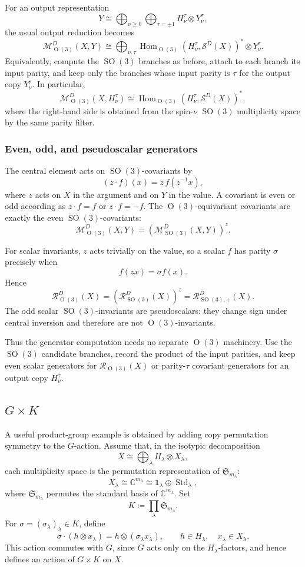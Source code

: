 \documentclass[11pt]{article}
\newcommand{\dsC}{\mathbb{C}}
\newcommand{\scM}{\mathcal{M}}
\newcommand{\scR}{\mathcal{R}}
\newcommand{\scS}{\mathcal{S}}
\newcommand{\SO}{\operatorname{SO}}
\newcommand{\Orth}{\operatorname{O}}
\theoremstyle{definition}
\begin{document}
For an output representation
\[
  Y\cong
  \bigoplus_{\nu\ge 0}\bigoplus_{\tau=\pm1}
  H_\nu^\tau\otimes Y_\nu^\tau,
\]
the usual output reduction becomes
\[
  \scM_{\Orth(3)}^D(X,Y)
  \cong
  \bigoplus_{\nu,\tau}
  \operatorname{Hom}_{\Orth(3)}\!\left(H_\nu^\tau,\scS^D(X)\right)^*
  \otimes Y_\nu^\tau .
\]
Equivalently, compute the $\SO(3)$ branches as before, attach to each branch its input parity, and keep only the branches whose input parity is $\tau$ for the output copy $Y_\nu^\tau$.
In particular,
\[
  \scM_{\Orth(3)}^D(X,H_\nu^\tau)
  \cong
  \operatorname{Hom}_{\Orth(3)}\!\left(H_\nu^\tau,\scS^D(X)\right)^*,
\]
where the right-hand side is obtained from the spin-$\nu$ $\SO(3)$ multiplicity space by the same parity filter.

\subsubsection{Even, odd, and pseudoscalar generators}

The central element acts on $\SO(3)$-covariants by
\[
  (z\cdot f)(x)=z\,f(z^{-1}x),
\]
where $z$ acts on $X$ in the argument and on $Y$ in the value.
A covariant is even or odd according as $z\cdot f=f$ or $z\cdot f=-f$.
The $\Orth(3)$-equivariant covariants are exactly the even $\SO(3)$-covariants:
\[
  \scM_{\Orth(3)}^D(X,Y)
  =
  \left(\scM_{\SO(3)}^D(X,Y)\right)^z .
\]

For scalar invariants, $z$ acts trivially on the value, so a scalar $f$ has parity $\sigma$ precisely when
\[
  f(zx)=\sigma f(x).
\]
Hence
\[
  \scR_{\Orth(3)}^D(X)
  =
  \left(\scR_{\SO(3)}^D(X)\right)^z
  =
  \scR_{\SO(3),+}^D(X).
\]
The odd scalar $\SO(3)$-invariants are pseudoscalars: they change sign under central inversion and therefore are not $\Orth(3)$-invariants.

Thus the generator computation needs no separate $\Orth(3)$ machinery.
Use the $\SO(3)$ candidate branches, record the product of the input parities, and keep even scalar generators for $\scR_{\Orth(3)}(X)$ or parity-$\tau$ covariant generators for an output copy $H_\nu^\tau$.

\subsection{\texorpdfstring{$G\times K$}{G x K}}\label{sec:examples-g-times-k}

A useful product-group example is obtained by adding copy permutation symmetry to the $G$-action.
Assume that, in the isotypic decomposition
\[
  X\cong\bigoplus_\lambda H_\lambda\otimes X_\lambda,
\]
each multiplicity space is the permutation representation of $\mathfrak S_{m_\lambda}$:
\[
  X_\lambda\cong \dsC^{m_\lambda}
  \cong
  \mathbf{1}_\lambda\oplus \operatorname{Std}_\lambda,
\]
where $\mathfrak S_{m_\lambda}$ permutes the standard basis of $\dsC^{m_\lambda}$.
Set
\[
  K\coloneq \prod_\lambda \mathfrak S_{m_\lambda}.
\]
For $\sigma=(\sigma_\lambda)_\lambda\in K$, define
\[
  \sigma\cdot(h\otimes x_\lambda)
  =
  h\otimes (\sigma_\lambda x_\lambda),
  \qquad
  h\in H_\lambda,\quad x_\lambda\in X_\lambda.
\]
This action commutes with $G$, since $G$ acts only on the $H_\lambda$-factors, and hence defines an action of $G\times K$ on $X$.
\end{document}
